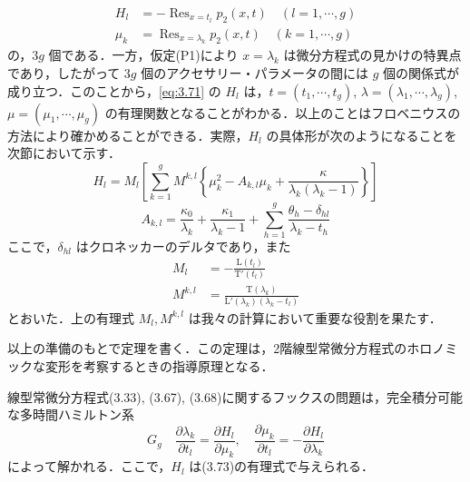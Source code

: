 \begin{story}
\begin{align}
H_l &= -\operatorname{Res}_{x=t_l} p_2(x,t) \quad (l = 1, \cdots, g) \label{eq:3.71} \\
\mu_k &= \operatorname{Res}_{x=\lambda_k} p_2(x,t) \quad (k = 1, \cdots, g) \label{eq:3.72}
\end{align}
の，$3g$ 個である．一方，仮定(P1)により $x=\lambda_k$ は微分方程式の見かけの特異点であり，したがって $3g$ 個のアクセサリー・パラメータの間には $g$ 個の関係式が成り立つ．このことから，\eqref{eq:3.71} の $H_l$ は，$t=(t_1,\cdots,t_g)$, $\lambda=(\lambda_1,\cdots,\lambda_g)$, $\mu=(\mu_1,\cdots,\mu_g)$ の有理関数となることがわかる．以上のことはフロベニウスの方法により確かめることができる．実際，$H_l$ の具体形が次のようになることを次節において示す．
\begin{equation}
H_l = M_l \left[ \sum_{k=1}^g M^{k,l} \left\{ \mu_k^2 - A_{k,l}\mu_k + \frac{\kappa}{\lambda_k(\lambda_k-1)} \right\} \right] \label{eq:3.73}
\end{equation}
\begin{equation*}
A_{k,l} = \frac{\kappa_0}{\lambda_k} + \frac{\kappa_1}{\lambda_k-1} + \sum_{h=1}^g \frac{\theta_h - \delta_{hl}}{\lambda_k - t_h}
\end{equation*}
ここで，$\delta_{hl}$ はクロネッカーのデルタであり，また
\begin{align}
M_l &= - \frac{\mathrm{L}(t_l)}{\mathrm{T}'(t_l)} \label{eq:3.74} \\
M^{k,l} &= \frac{\mathrm{T}(\lambda_k)}{\mathrm{L}'(\lambda_k)(\lambda_k - t_l)} \label{eq:3.75}
\end{align}
とおいた．上の有理式 $M_l, M^{k,l}$ は我々の計算において重要な役割を果たす．

以上の準備のもとで定理を書く．この定理は，2階線型常微分方程式のホロノミックな変形を考察するときの指導原理となる．
\end{story}

\begin{theorem}[ガルニエ系のハミルトン系表示]
線型常微分方程式(3.33), (3.67), (3.68)に関するフックスの問題は，完全積分可能な多時間ハミルトン系
\begin{equation*}
G_g \quad \frac{\partial \lambda_k}{\partial t_l} = \frac{\partial H_l}{\partial \mu_k}, \quad \frac{\partial \mu_k}{\partial t_l} = - \frac{\partial H_l}{\partial \lambda_k}
\end{equation*}
によって解かれる．ここで，$H_l$ は(3.73)の有理式で与えられる．
\end{theorem}

